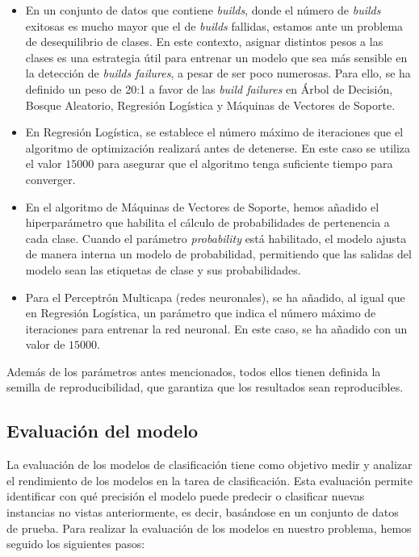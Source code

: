 \begin{itemize}
	\item En un conjunto de datos que contiene \textit{builds}, donde el número de \textit{builds}
    exitosas es mucho mayor que el de \textit{builds} fallidas, estamos ante un problema de
    desequilibrio de clases. En este contexto, asignar distintos pesos a las clases es una
    estrategia útil para entrenar un modelo que sea más sensible en la detección de
    \textit{builds failures}, a pesar de ser poco numerosas. Para ello, se ha definido un peso de
    20:1 a favor de las \textit{build failures} en Árbol de Decisión, Bosque Aleatorio, Regresión
    Logística y Máquinas de Vectores de Soporte.\\

	\item En Regresión Logística, se establece el número máximo de iteraciones que el algoritmo de
    optimización realizará antes de detenerse. En este caso se utiliza el valor $15000$ para
    asegurar que el algoritmo tenga suficiente tiempo para converger.\\

	\item En el algoritmo de Máquinas de Vectores de Soporte, hemos añadido el hiperparámetro que
    habilita el cálculo de probabilidades de pertenencia a cada clase. Cuando el parámetro
    \textit{probability} está habilitado, el modelo ajusta de manera interna un modelo de
    probabilidad, permitiendo que las salidas del modelo sean las etiquetas de clase y sus
    probabilidades.\\

	\item Para el Perceptrón Multicapa (redes neuronales), se ha añadido, al igual que en Regresión
    Logística, un parámetro que indica el número máximo de iteraciones para entrenar la red
    neuronal. En este caso, se ha añadido con un valor de $15000$.
\end{itemize}

Además de los parámetros antes mencionados, todos ellos tienen definida la semilla de
reproducibilidad, que garantiza que los resultados sean reproducibles.

\subsection{Evaluación del modelo}
La evaluación de los modelos de clasificación tiene como objetivo medir y analizar el rendimiento
de los modelos en la tarea de clasificación. Esta evaluación permite identificar con qué precisión
el modelo puede predecir o clasificar nuevas instancias no vistas anteriormente, es decir, basándose
en un conjunto de datos de prueba. Para realizar la evaluación de los modelos en nuestro problema,
hemos seguido los siguientes pasos:

